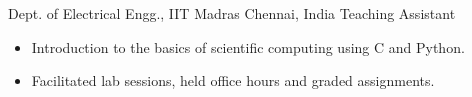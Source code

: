 
        {Dept. of Electrical Engg., IIT Madras}
        {Chennai, India}
        {Teaching Assistant}
        {}{
    \begin{itemize}
        \item Introduction to the basics of scientific computing using C and Python.
        \item Facilitated lab sessions, held office hours and graded assignments.
    \end{itemize}
}
